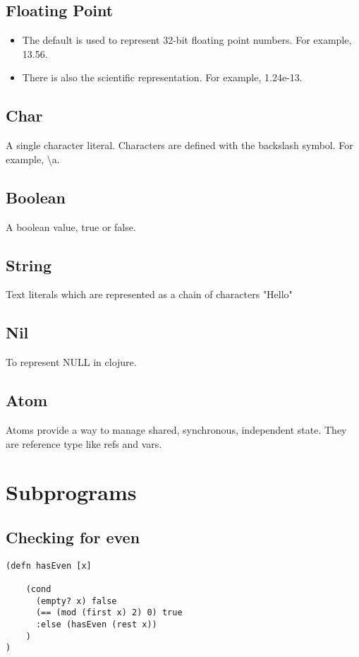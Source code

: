\documentclass{article}
\begin{document}
\subsection{Floating Point}
\begin{itemize}
\item The default is used to represent 32-bit floating point numbers. For example, 13.56.
\item There is also the scientific representation. For example, 1.24e-13.
\end{itemize}

\subsection{Char}
A single character literal. Characters are defined with the backslash symbol. For example, \textbackslash a.

\subsection{Boolean}
A boolean value, true or false.

\subsection{String}
Text literals which are represented as a chain of characters "Hello"

\subsection{Nil}
To represent NULL in clojure.

\subsection{Atom}
Atoms provide a way to manage shared, synchronous, independent state. They are reference type like refs and vars.


\section{Subprograms}
\subsection{Checking for even}
\begin{lstlisting}
(defn hasEven [x]

    (cond
      (empty? x) false
      (== (mod (first x) 2) 0) true
      :else (hasEven (rest x))
    )
)
\end{lstlisting}
\end{document}
